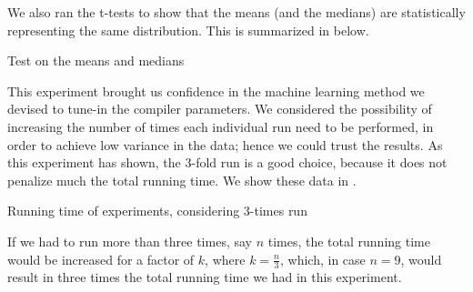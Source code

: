 We also ran the t-tests to show that the means (and the medians) are statistically representing the same distribution. This is summarized in  below.

\begin{table}
  \centering
  \begin{tiny}
  
  \end{tiny}
  \caption{Test on the means and medians}
  \label{tab:statTest}
\end{table}

This experiment brought us confidence in the machine learning method we devised to tune-in the compiler parameters. We considered the possibility of increasing the number of times each individual run need to be performed, in order to achieve low variance in the data; hence we could trust the results. As this experiment has shown, the $3$-fold run is a good choice, because it does not penalize much the total running time. We show these data in .

\begin{table}
  \centering
  \begin{tiny}
  
  \end{tiny}
  \caption{Running time of experiments, considering $3$-times run}
  \label{tab:runTime}
\end{table}

If we had to run more than three times, say $n$ times, the total running time would be increased for a factor of $k$, where $k = \frac{n}{3}$, which, in case $n = 9$, would result in three times the total running time we had in this experiment.
